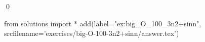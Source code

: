 \begin{ex}
  \label{ex:big_O_100_3n2+sinn}
  
  \mbox{}\\ \\
  \qed
\end{ex}
\begin{python0}
from solutions import *
add(label="ex:big_O_100_3n2+sinn",
    srcfilename='exercises/big-O-100-3n2+sinn/answer.tex') 
\end{python0}                              
